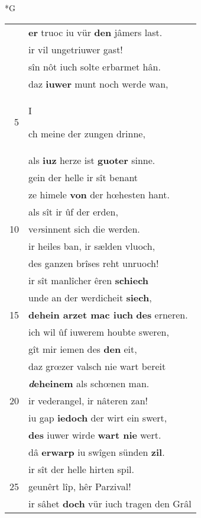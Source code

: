 \documentclass[8pt,a4paper,notitlepage]{article}
\begin{document}
\newpage
\begin{table}[ht]
\begin{minipage}[t]{0.5\linewidth}
\small
\begin{center}*G
\end{center}
\begin{tabular}{rl}
 & \textbf{er} truoc iu vür \textbf{den} jâmers last.\\ 
 & ir vil ungetriuwer gast!\\ 
 & sîn nôt iuch solte erbarmet hân.\\ 
 & daz \textbf{iuwer} munt noch werde wan,\\ 
5 & \begin{large}I\end{large}ch meine der zungen drinne,\\ 
 & als \textbf{iuz} herze ist \textbf{guoter} sinne.\\ 
 & gein der helle ir sît benant\\ 
 & ze himele \textbf{von} der hœhesten hant.\\ 
 & als sît ir ûf der erden,\\ 
10 & ve\textit{r}sinnent sich die werden.\\ 
 & ir heiles ban, ir sælden vluoch,\\ 
 & des ganzen brîses reht unruoch!\\ 
 & ir sît manlîcher êren \textbf{schiech}\\ 
 & unde an der werdicheit \textbf{siech},\\ 
15 & \textbf{dehein arzet mac iuch} \textbf{des} erneren.\\ 
 & ich wil ûf iuwerem houbte sweren,\\ 
 & gît mir iemen des \textbf{den} eit,\\ 
 & daz grœzer valsch nie wart bereit\\ 
 & \textbf{\textit{d}eheinem} als schœnen man.\\ 
20 & ir vederangel, ir nâteren zan!\\ 
 & iu gap \textbf{iedoch} der wirt ein swert,\\ 
 & \textbf{des} iuwer wirde \textbf{wart nie} wert.\\ 
 & dâ \textbf{erwarp} iu swîgen sünden \textbf{zil}.\\ 
 & ir sît der helle hirten spil.\\ 
25 & geunêrt lîp, hêr Parzival!\\ 
 & ir sâhet \textbf{doch} vür iuch tragen den Grâl\\ 

\end{tabular}
\end{minipage}
\end{table}
\end{document}
